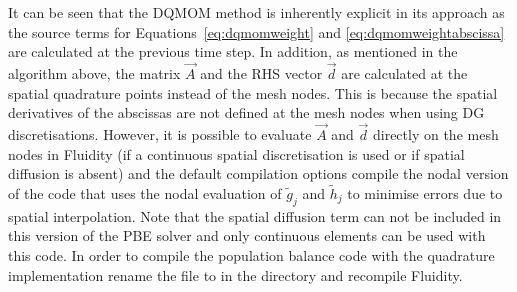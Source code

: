 It can be seen that the DQMOM method is inherently explicit in its approach as the source terms for Equations~\eqref{eq:dqmomweight} and \eqref{eq:dqmomweightabscissa} are calculated at the previous time step. 
In addition, as mentioned in the algorithm above, the matrix $\vec{A}$ and the RHS vector $\vec{d}$ are calculated at the spatial quadrature points instead of the mesh nodes. This is because the spatial derivatives of the abscissas are not defined at the mesh nodes when using DG discretisations.
However, it is possible to evaluate $\vec{A}$ and $\vec{d}$ directly on the mesh nodes in Fluidity (if a continuous spatial discretisation is used or if spatial diffusion is absent) and the default compilation options compile the nodal version of the code that uses the nodal evaluation of $\widetilde{g}_j$ and $\widetilde{h}_j$ to minimise errors due to spatial interpolation.
Note that the spatial diffusion term can not be included in this version of the PBE solver and only continuous elements can be used with this code. In order to compile the population balance code with the quadrature implementation rename the file 
 to  in the  directory and recompile Fluidity.
